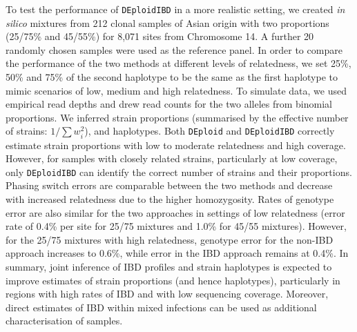 \documentclass[9pt,lineno]{elife}
\begin{document}
To test the performance of \texttt{DEploidIBD} in a more realistic setting, we created {\it in silico} mixtures from 212 clonal samples of Asian origin with two proportions (25/75\% and 45/55\%) for 8,071 sites from Chromosome 14.  A further 20 randomly chosen samples were used as the reference panel. In order to compare the performance of the two methods at different levels of relatedness, we set 25\%, 50\% and 75\% of the second haplotype to be the same as the first haplotype to mimic scenarios of low, medium and high relatedness. To simulate data, we used empirical read depths and drew read counts for the two alleles from binomial proportions.  We inferred strain proportions (summarised by the effective number of strains: $1/\sum w_{i}^{2}$), and haplotypes.  Both \texttt{DEploid} and \texttt{DEploidIBD} correctly estimate strain proportions with low to moderate relatedness and high coverage.  However, for samples with closely related strains, particularly at low coverage, only \texttt{DEploidIBD} can identify the correct number of strains and their proportions.  Phasing switch errors are comparable between the two methods and decrease with increased relatedness due to the higher homozygosity.  Rates of genotype error are also similar for the two approaches in settings of low relatedness (error rate of 0.4\% per site for 25/75 mixtures and 1.0\% for 45/55 mixtures).  However, for the 25/75 mixtures with high relatedness, genotype error for the non-IBD approach increases to 0.6\%, while error in the IBD approach remains at 0.4\%.  In summary, joint inference of IBD profiles and strain haplotypes is expected to improve estimates of strain proportions (and hence haplotypes), particularly in regions with high rates of IBD and with low sequencing coverage.  Moreover, direct estimates of IBD within mixed infections can be used as additional characterisation of samples.
\end{document}
